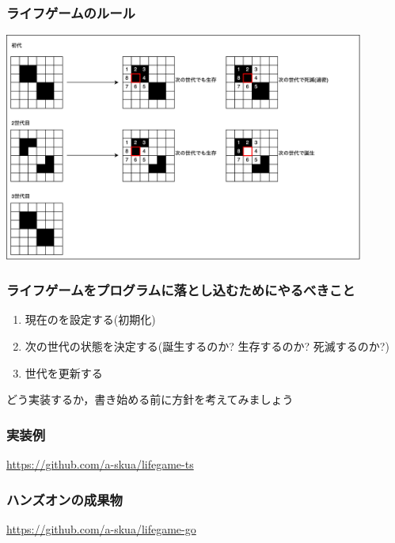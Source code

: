 \documentclass[aspectratio=169]{beamer}
\begin{document}
\begin{frame}\frametitle{ライフゲームのルール}
  \begin{center}
    \includegraphics[height=7.5cm]{asset/lifegame_cycle.png}
  \end{center}
\end{frame}

\begin{frame}\frametitle{ライフゲームをプログラムに落とし込むためにやるべきこと}
  \begin{enumerate}
    \item 現在のを設定する(初期化)
    \item 次の世代の状態を決定する(誕生するのか? 生存するのか? 死滅するのか?)
    \item 世代を更新する
  \end{enumerate}

  どう実装するか，書き始める前に方針を考えてみましょう
\end{frame}

\begin{frame}\frametitle{実装例}
  \url{https://github.com/a-skua/lifegame-ts}
\end{frame}

\begin{frame}\frametitle{ハンズオンの成果物}
  \url{https://github.com/a-skua/lifegame-go}
\end{frame}
\end{document}
